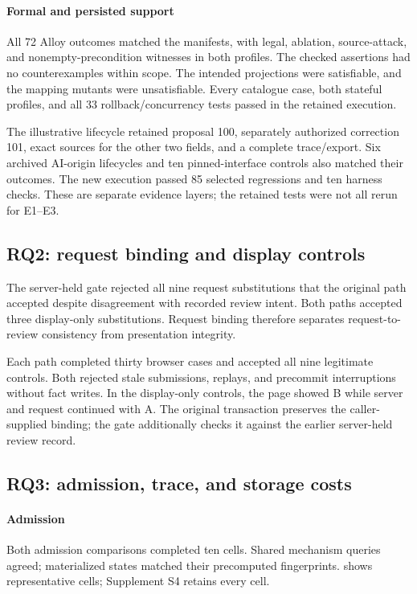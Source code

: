 \paragraph{Formal and persisted support}
All 72 Alloy outcomes matched the manifests, with legal, ablation, source-attack, and nonempty-precondition witnesses in both profiles. The checked assertions had no counterexamples within scope. The intended projections were satisfiable, and the mapping mutants were unsatisfiable. Every catalogue case, both stateful profiles, and all 33 rollback/concurrency tests passed in the retained execution.

The illustrative lifecycle retained proposal 100, separately authorized correction 101, exact sources for the other two fields, and a complete trace/export. Six archived AI-origin lifecycles and ten pinned-interface controls also matched their outcomes. The new execution passed 85 selected regressions and ten harness checks. These are separate evidence layers; the retained tests were not all rerun for E1--E3.

\subsection{RQ2: request binding and display controls}

The server-held gate rejected all nine request substitutions that the original path accepted despite disagreement with recorded review intent. Both paths accepted three display-only substitutions. Request binding therefore separates request-to-review consistency from presentation integrity.



Each path completed thirty browser cases and accepted all nine legitimate controls. Both rejected stale submissions, replays, and precommit interruptions without fact writes. In the display-only controls, the page showed B while server and request continued with A. The original transaction preserves the caller-supplied binding; the gate additionally checks it against the earlier server-held review record.

\subsection{RQ3: admission, trace, and storage costs}

\paragraph{Admission}
Both admission comparisons completed ten cells. Shared mechanism queries agreed; materialized states matched their precomputed fingerprints.  shows representative cells; Supplement S4 retains every cell.

